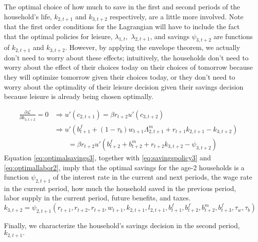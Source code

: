 \documentclass[BufferStockTheory]{subfiles}
\begin{document}
The optimal choice of how much to save in the first and second periods of the household's life, $k_{2,t+1}$ and $k_{3,t+2}$ respectively, are a little more involved. Note that the first order conditions for the Lagrangian will have to include the fact that the optimal policies for leisure, $\lambda_{1,t},$ $\lambda_{2,t+1}$, and savings $\psi_{3,t+2}$ are functions of 
$k_{2,t+1}$ and $k_{3,t+2}$. However, by applying the envelope theorem, we actually don't need to worry about these effects; intuitively, the households don't need to worry about the effect of their choices today on their choices of tomorrow because they will optimize tomorrow given their choices today, or they don't need to worry about the optimality of their leisure decision given their savings decision because leisure is already being chosen optimally. 


\begin{equation}
	\label{eq:optimalsavings3}
	\begin{aligned}
		\frac{\partial\mathcal{L}}{\partial k_{3,t+2}}=0 & \Rightarrow u'(c_{2,t+1})=\beta r_{t+2}
		u'(c_{3,t+2}) \\
		&\Rightarrow u'\left(b_{t+1}^f+(1-\tau_b)w_{t+1} \Lambda_{2,t+1}^m + r_{t+1}k_{2,t+1} -k_{3,t+2}\right) \\
		&\qquad = \beta r_{t+2}
		u'\left(b_{t+2}^f+ b_{t+2}^m  + r_{t+2}k_{3,t+2} -\psi_{3,t+2}\right)
\end{aligned}
\end{equation}
Equation \eqref{eq:optimalsavings3}, together with \eqref{eq:savingspolicy3} and \eqref{eq:optimallabor2}, imply that the optimal savings for the age-2 households is a function $\psi_{2,t+1}$ of the interest rate in the current and next periods, the wage rate in the current period, how much the household saved in the previous period, labor supply in the current period, future benefits, and taxes. 
\begin{equation}
	\label{eq:savingspolicy2}
	k_{3,t+2}=\psi_{2,t+1}(r_{t+1},r_{t+2},r_{t+3},w_{t+1}, k_{2,t+1},l_{2,t+1},b_{t+1}^f,b_{t+2}^f,b_{t+2}^m,b_{t+3}^f,\tau_w,\tau_b)
\end{equation}

Finally, we characterize the household's savings decision in the second period, $k_{2,t+1}.$
\end{document}
